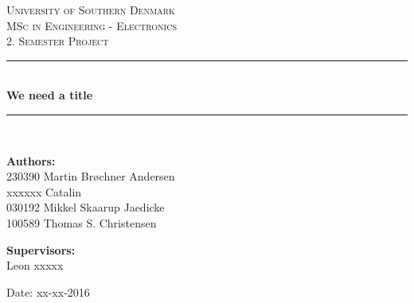 \begin{titlepage}
\begin{center}

\textsc{\LARGE University of Southern Denmark}\\[1.5cm]
\textsc{\Large MSc in Engineering - Electronics}\\
\textsc{\large 2. Semester Project}\\[0.5cm]

\vfill
\vspace{3cm}
\hrule ~\\[0.3cm]
{ \LARGE \bfseries We need a title\\[0.4cm] }
\hrule ~\\[1.5cm]

\vfill

\vspace{7cm}
\begin{minipage}[t]{.49\textwidth}
\begin{flushleft} \large
\textbf{Authors:}\\
230390 Martin Brøchner Andersen\\
xxxxxx Catalin\\
030192 Mikkel Skaarup Jaedicke\\
100589 Thomas S. Christensen
\end{flushleft}
\end{minipage}
\begin{minipage}[t]{.49\textwidth}
\begin{flushright} \large
\textbf{Supervisors:} \\
Leon xxxxx
\end{flushright}
\end{minipage}

\vspace{1cm}
Date: xx-xx-2016

\vspace{1cm}

\end{center}
\restoregeometry
\end{titlepage}
